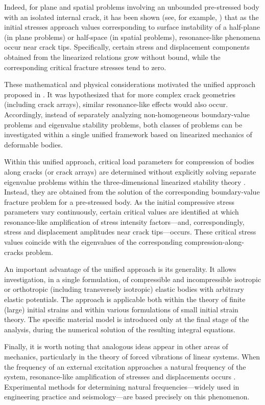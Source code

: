 Indeed, for plane and spatial problems involving an unbounded pre-stressed body with an isolated internal crack, it has been shown (see, for example, \cite{BogdanovGuz27}) that as the initial stresses approach values corresponding to surface instability of a half-plane (in plane problems) or half-space (in spatial problems), resonance-like phenomena occur near crack tips. Specifically, certain stress and displacement components obtained from the linearized relations grow without bound, while the corresponding critical fracture stresses tend to zero.

These mathematical and physical considerations motivated the unified approach proposed in \cite{BogdanovGuz34}. It was hypothesized that for more complex crack geometries (including crack arrays), similar resonance-like effects would also occur. Accordingly, instead of separately analyzing non-homogeneous boundary-value problems and eigenvalue stability problems, both classes of problems can be investigated within a single unified framework based on linearized mechanics of deformable bodies.

Within this unified approach, critical load parameters for compression of bodies along cracks (or crack arrays) are determined without explicitly solving separate eigenvalue problems within the three-dimensional linearized stability theory \cite{BogdanovGuz28}. Instead, they are obtained from the solution of the corresponding boundary-value fracture problem for a pre-stressed body. As the initial compressive stress parameters vary continuously, certain critical values are identified at which resonance-like amplification of stress intensity factors—and, correspondingly, stress and displacement amplitudes near crack tips—occurs. These critical stress values coincide with the eigenvalues of the corresponding compression-along-cracks problem.

An important advantage of the unified approach is its generality. It allows investigation, in a single formulation, of compressible and incompressible isotropic or orthotropic (including transversely isotropic) elastic bodies with arbitrary elastic potentials. The approach is applicable both within the theory of finite (large) initial strains and within various formulations of small initial strain theory. The specific material model is introduced only at the final stage of the analysis, during the numerical solution of the resulting integral equations.

Finally, it is worth noting that analogous ideas appear in other areas of mechanics, particularly in the theory of forced vibrations of linear systems. When the frequency of an external excitation approaches a natural frequency of the system, resonance-like amplification of stresses and displacements occurs \cite{BogdanovGuz59}. Experimental methods for determining natural frequencies—widely used in engineering practice and seismology—are based precisely on this phenomenon.

